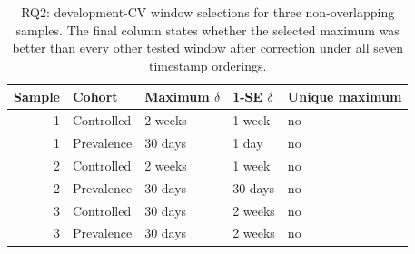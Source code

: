 \begin{table}[ht]
\centering
\caption{RQ2: development-CV window selections for three non-overlapping samples. The final column states whether the selected maximum was better than every other tested window after correction under all seven timestamp orderings.}
\label{tab:res_rq2}
\small
\begin{tabular}{@{}r l l l l@{}}
\toprule
\textbf{Sample} & \textbf{Cohort} & \textbf{Maximum $\delta$} & \textbf{1-SE $\delta$} & \textbf{Unique maximum} \\
\midrule
1 & Controlled & 2 weeks & 1 week & no \\
1 & Prevalence & 30 days & 1 day & no \\
2 & Controlled & 2 weeks & 1 week & no \\
2 & Prevalence & 30 days & 30 days & no \\
3 & Controlled & 30 days & 2 weeks & no \\
3 & Prevalence & 30 days & 2 weeks & no \\
\bottomrule
\end{tabular}
\end{table}
